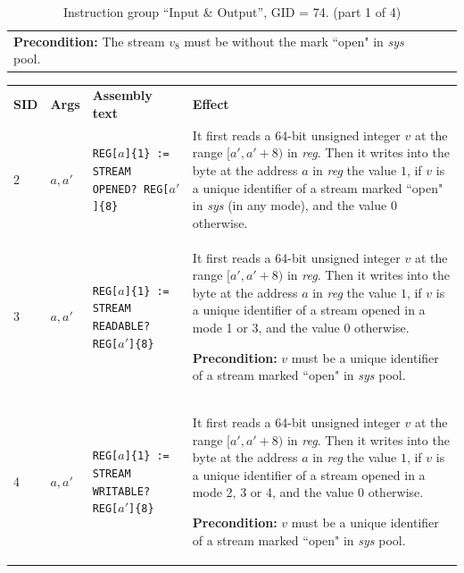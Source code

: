 \documentclass[10pt,twocolumn]{article}
\begin{document}
\begin{table}[!h]
\begin{center}
\begin{tabular}{lp{1.2cm}p{5.5cm}p{7.5cm}}
\textbf{Precondition:} The stream $ v_8 $ must be without the mark ``open" in
\textit{sys} pool. \\

\end{tabular}
\end{center}
\caption{Instruction group ``Input \& Output'', GID = 74. (part 1 of 4)}
\label{tab:igroup:IO}
\end{table}

\begin{table}[!h]
\begin{center}
\def\arraystretch{1.5}
\begin{tabular}{lp{1.2cm}p{5.5cm}p{7.5cm}}
\textbf{SID} & \textbf{Args} & \textbf{Assembly text} & \textbf{Effect}
\\

2 & $ a,a' $ %
& \texttt{REG[}$ a $\texttt{]\{1\} := STREAM OPENED?  REG[}$ a'
$\texttt{]\{8\}} %
& It first reads a 64-bit unsigned integer $ v $ at the range $ [a',a'+8) $ in
\textit{reg}. Then it writes into the byte at the address $ a $ in \textit{reg}
the value $ 1 $, if $ v $ is a unique identifier of a stream marked ``open" in
\textit{sys} (in any mode), and the value $ 0 $ otherwise.
\\

3 & $ a,a' $ %
& \texttt{REG[}$ a $\texttt{]\{1\} := STREAM READABLE?  REG[}$ a'
$\texttt{]\{8\}} %
& It first reads a 64-bit unsigned integer $ v $ at the range $ [a',a'+8) $ in
\textit{reg}. Then it writes into the byte at the address $ a $ in \textit{reg}
the value $ 1 $, if $ v $ is a unique identifier of a stream opened in a mode 1
or 3, and the value $ 0 $ otherwise.

\textbf{Precondition:} $ v $ must be a unique identifier of a stream marked
``open" in \textit{sys} pool. \\

4 & $ a,a' $ %
& \texttt{REG[}$ a $\texttt{]\{1\} := STREAM WRITABLE?  REG[}$ a'
$\texttt{]\{8\}} %
& It first reads a 64-bit unsigned integer $ v $ at the range $ [a',a'+8) $ in
\textit{reg}. Then it writes into the byte at the address $ a $ in \textit{reg}
the value $ 1 $, if $ v $ is a unique identifier of a stream opened in a mode 2,
3 or 4, and the value $ 0 $ otherwise.

\textbf{Precondition:} $ v $ must be a unique identifier of a stream marked
``open" in \textit{sys} pool. \\


\end{tabular}
\end{center}
\end{table}
\end{document}
